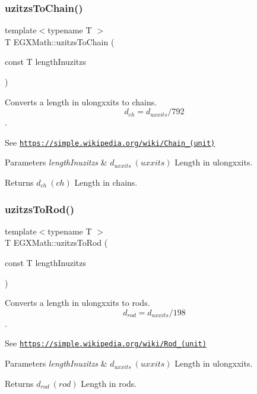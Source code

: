 \subsubsection{\texorpdfstring{uzitzs\+To\+Chain()}{uzitzsToChain()}}
{\footnotesize\ttfamily template$<$typename T $>$ \\
T E\+G\+X\+Math\+::uzitzs\+To\+Chain (\begin{DoxyParamCaption}\item[{const T}]{length\+Inuzitzs }\end{DoxyParamCaption})}



Converts a length in ulongxxits to chains. \[ d_{ch}=d_{uxxits} / 792 \]. 

See \href{https://simple.wikipedia.org/wiki/Chain_(unit)}{\tt https\+://simple.\+wikipedia.\+org/wiki/\+Chain\+\_\+(unit)} 
\begin{DoxyParams}{Parameters}
{\em length\+Inuzitzs} & $ d_{uxxits}\ (uxxits)$ Length in ulongxxits. \\
\hline
\end{DoxyParams}
\begin{DoxyReturn}{Returns}
$ d_{ch}\ (ch)$ Length in chains. 
\end{DoxyReturn}
\mbox{\label{group___e_g_x_math-_conversions-_length_conversions-uzitzs-_surveyors_gaf6062ab067930d296074de9e8301871d}} 
\subsubsection{\texorpdfstring{uzitzs\+To\+Rod()}{uzitzsToRod()}}
{\footnotesize\ttfamily template$<$typename T $>$ \\
T E\+G\+X\+Math\+::uzitzs\+To\+Rod (\begin{DoxyParamCaption}\item[{const T}]{length\+Inuzitzs }\end{DoxyParamCaption})}



Converts a length in ulongxxits to rods. \[ d_{rod}=d_{uxxits} /198 \]. 

See \href{https://simple.wikipedia.org/wiki/Rod_(unit)}{\tt https\+://simple.\+wikipedia.\+org/wiki/\+Rod\+\_\+(unit)} 
\begin{DoxyParams}{Parameters}
{\em length\+Inuzitzs} & $ d_{uxxits}\ (uxxits)$ Length in ulongxxits. \\
\hline
\end{DoxyParams}
\begin{DoxyReturn}{Returns}
$ d_{rod}\ (rod)$ Length in rods. 
\end{DoxyReturn}
